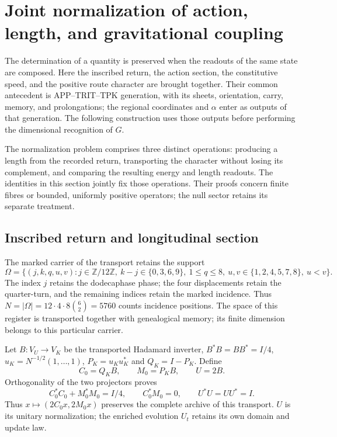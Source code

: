 \clearpage
\section{Joint normalization of action, length, and gravitational coupling}
\label{md:rigidez}

The determination of a quantity is preserved when the readouts of the
same state are composed. Here the inscribed return, the action section,
the constitutive speed, and the positive route character are brought
together. Their common antecedent is APP--TRIT--TPK generation, with
its sheets, orientation, carry, memory, and prolongations; the regional
coordinates and $\alpha$ enter as outputs of that generation. The
following construction uses those outputs before performing the
dimensional recognition of $G$.

The normalization problem comprises three distinct operations: producing
a length from the recorded return, transporting the character without
losing its complement, and comparing the resulting energy and length
readouts. The identities in this section jointly fix those operations.
Their proofs concern finite fibres or bounded, uniformly positive
operators; the null sector retains its separate treatment.

\subsection{Inscribed return and longitudinal section}
\label{md:rigidez:longitud}

The marked carrier of the transport retains the support
\[
 \Omega=\{(j,k,q,u,v):j\in\mathbb Z/12\mathbb Z,\ 
 k-j\in\{0,3,6,9\},\ 1\le q\le8,\
 u,v\in\{1,2,4,5,7,8\},\ u<v\}.
\]
The index $j$ retains the dodecaphase phase; the four displacements
retain the quarter-turn, and the remaining indices retain the marked
incidence. Thus $N=|\Omega|=12\cdot4\cdot8\binom62=5760$ counts
incidence positions. The space of this register is transported together
with genealogical memory; its finite dimension belongs to this particular
carrier.

Let $B:V_U\to V_K$ be the transported Hadamard inverter,
$B^*B=BB^*=I/4$, $u_K=N^{-1/2}(1,\ldots,1)$,
$P_K=u_Ku_K^*$ and $Q_K=I-P_K$. Define
\[
 C_0=Q_KB,\qquad M_0=P_KB,\qquad U=2B.
\]
Orthogonality of the two projectors proves
\[
 C_0^*C_0+M_0^*M_0=I/4,\qquad C_0^*M_0=0,\qquad U^*U=UU^*=I.
\]
Thus $x\mapsto(2C_0x,2M_0x)$ preserves the complete archive of this
transport. $U$ is its unitary normalization; the enriched evolution
$U_t$ retains its own domain and update law.

